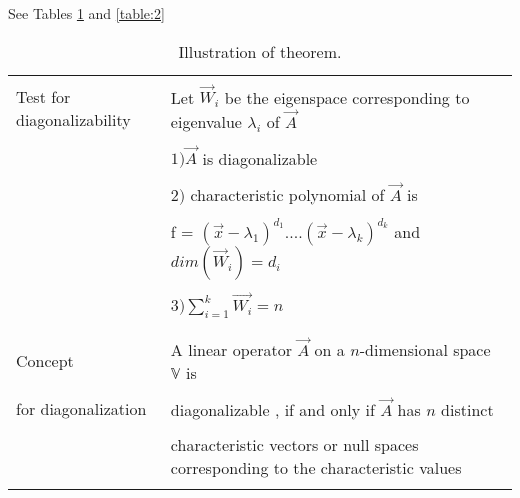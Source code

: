 See Tables \ref{table:1} and \ref{table:2}


\onecolumn
\begin{longtable}{|l|l|}
\hline
\multirow{3}{*}{Test for diagonalizability} & \\
& Let $\vec{W}_{i}$ be the eigenspace corresponding to eigenvalue $\lambda_{i}$  of $\vec{A}$\\
&\\
& $1)\vec{A}$ is diagonalizable \\
&\\
& $2)$ characteristic polynomial of $\vec{A}$ is \\
&\\
& f = $(\vec{x}-\lambda_1)^{d_1}....(\vec{x}-\lambda_k)^{d_k}$ and $dim(\vec{W}_i) = d_i $\\
&\\
& $3) \sum_{i=1}^{k}\vec{W_i}=n$\\
&\\
\hline
\multirow{3}{*}{Concept} & \\
&
A linear operator $\vec{A}$ on a $n$-dimensional space $\mathbb{V}$ is\\ 
&\\ for diagonalization
& diagonalizable , if and only if $\vec{A}$ has $n$ distinct \\
&\\
& characteristic vectors or null spaces corresponding to the characteristic values\\
\hline
\caption{Illustration of theorem.}
\label{table:1}
\end{longtable}
